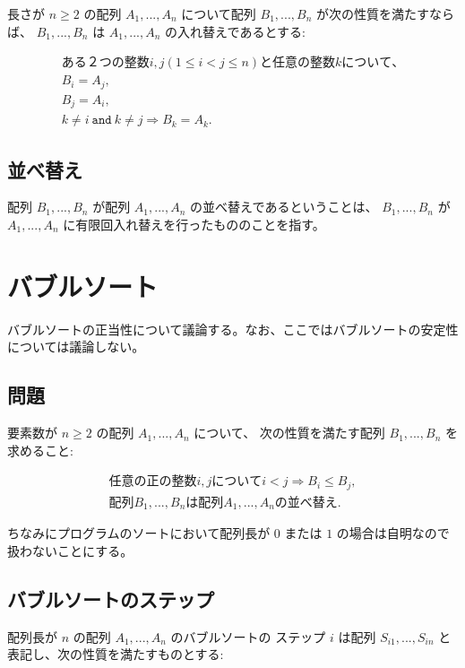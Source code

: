 \documentclass{jsarticle}
\begin{document}
長さが $n \ge 2$ の配列 $A_1, ..., A_n$ について配列 $B_1, ..., B_n$ が次の性質を満たすならば、 $B_1, ..., B_n$ は $A_1, ..., A_n$ の入れ替えであるとする:

\begin{eqnarray}
ある２つの整数 i, j (1 \le i < j \le n) と任意の整数 k について、 \\
B_i = A_j, \\
B_j = A_i, \\
k \ne i ~\texttt{and}~ k \ne j \Longrightarrow B_k = A_k.
\end{eqnarray}

\subsection{並べ替え}

配列 $B_1, ..., B_n$ が配列 $A_1, ..., A_n$ の並べ替えであるということは、 $B_1, ..., B_n$ が $A_1, ..., A_n$ に有限回入れ替えを行ったもののことを指す。

\section{バブルソート}

バブルソートの正当性について議論する。なお、ここではバブルソートの安定性については議論しない。

\subsection{問題}

要素数が $n \ge 2$ の配列 $A_1, ..., A_n$ について、
次の性質を満たす配列 $B_1, ..., B_n$ を求めること:

\begin{eqnarray}
任意の正の整数 i, j について i < j \Longrightarrow B_i \le B_j, \\
配列 B_1, ..., B_n は配列 A_1, ..., A_n の並べ替え.
\end{eqnarray}

ちなみにプログラムのソートにおいて配列長が $0$ または $1$ の場合は自明なので扱わないことにする。

\subsection{バブルソートのステップ}

配列長が $n$ の配列 $A_1, ..., A_n$ のバブルソートの
ステップ $i$ は配列 $S_{i1}, ..., S_{in}$ と表記し、次の性質を満たすものとする:
\end{document}
